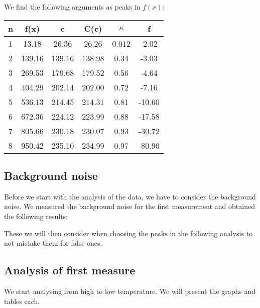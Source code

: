\documentclass[../main.tex]{subfiles}
\begin{document}
        We find the following arguments as peaks in $f(x)$:
        \begin{table}[H]
            \centering
            \begin{tabular}{c|c|c|c|c|c}
                n & f(x)    & c       & C(c)    & $\kappa$ & f\\
                \hline
                1 & 13.18   & 26.36   & 26.26   & 0.012 & -2.02 \\
                2 & 139.16  & 139.16  & 138.98  & 0.34  & -3.03  \\
                3 & 269.53  & 179.68  & 179.52  & 0.56  & -4.64  \\
                4 & 404.29  & 202.14  & 202.00  & 0.72  & -7.16  \\
                5 & 536.13  & 214.45  & 214.31  & 0.81  & -10.60 \\
                6 & 672.36  & 224.12  & 223.99  & 0.88  & -17.58 \\
                7 & 805.66  & 230.18  & 230.07  & 0.93  & -30.72 \\
                8 & 950.42  & 235.10  & 234.99  & 0.97  & -80.90
            \end{tabular}
        \end{table}

        

    \subsection*{Background noise}
        Before we start with the analysis of the data, we have to consider the background noise. We measured the background noise for the first measurement and obtained the following results:
        
        These we will then consider when choosing the peaks in the following analysis to not mistake them for false ones. 

    \subsection*{Analysis of first measure}
        We start analysing from high to low temperature. We will present the graphs and tables each. 
        
\end{document}
